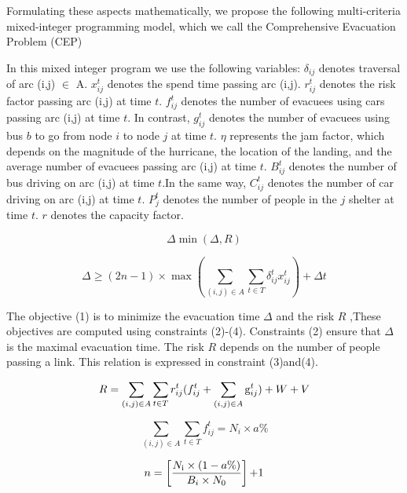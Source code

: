 \documentclass{mcmthesis}
\begin{document}
Formulating these aspects mathematically, we propose the following multi-criteria mixed-integer programming model, which we call the Comprehensive Evacuation Problem (CEP)\cite{Murray2013Evacuation,Ng2015Sharp,Ng2010Reliable}

In this mixed integer program we use the following variables: $\delta _{ij}$ denotes traversal of arc (i,j) $ \in $ A. $x_{ij}^t$ denotes the spend time passing arc (i,j). $r_{ij}^t$ denotes the risk factor passing arc (i,j) at time $t$. $f_{ij}^t$ denotes the number of evacuees using cars passing arc (i,j) at time $t$. In contrast, $g_{ij}^t$ denotes the number of evacuees using bus $b$ to go from node $i$ to node $j$ at time $t$. $\eta $ represents the jam factor, which depends on the magnitude of the hurricane, the location of the landing, and the average number of evacuees passing arc (i,j) at time $t$. $B_{ij}^t$ denotes the number of bus driving on arc (i,j) at time $t$.In the same way, $C_{ij}^t$ denotes the number of car driving on arc (i,j) at time $t$. $P_j^t$  denotes the number of people in the $j$ shelter at time $t$. $r$ denotes the capacity factor.


\begin{equation}\label{3}
\Delta \min (\Delta ,R)
\end{equation}

\begin{equation}\label{4}
\Delta  \ge (2n - 1) \times \max (\sum\limits_{(i,j) \in A} {\sum\limits_{t \in T} {\delta _{ij}^tx_{ij}^t} } ) + \Delta t
\end{equation}

The objective (1) is to minimize the evacuation time $\Delta $ and the risk $R$ ,These objectives are computed using constraints (2)-(4). Constraints (2) ensure that $\Delta $ is the maximal evacuation time. The risk $R$ depends on the number of people passing a link. This relation is expressed in constraint (3)and(4).

\begin{equation}\label{5}
 R = \sum\limits_{(i,j) \in A} {\sum\limits_{t \in T} {r_{ij}^t} } (f_{ij}^t + \sum\limits_{(i,j) \in A} {{\rm{g}}_{ij}^t} ) + W + V
\end{equation}

\begin{equation}\label{6}
\sum\limits_{(i,j) \in A} {\sum\limits_{t \in T} {f_{ij}^t} }  = {N_i} \times a\%
\end{equation}

\begin{equation}\label{7}
n = \left[ {\frac{{{N_{\rm{i}}} \times (1 - a\% )}}{{{B_i} \times {N_0}}}} \right]{\rm{ + }}1
\end{equation}
\end{document}
